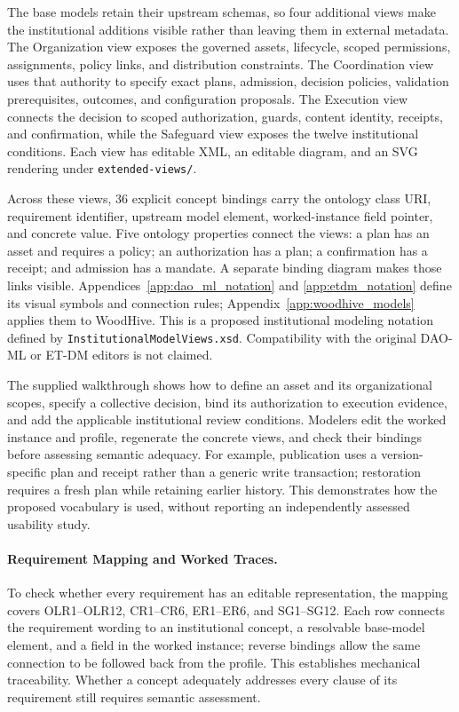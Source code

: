 \documentclass[journal]{IEEEtran}
\begin{document}
The base models retain their upstream schemas, so four additional views
make the institutional additions visible rather than leaving them in
external metadata. The Organization view exposes the governed assets,
lifecycle, scoped permissions, assignments, policy links, and distribution
constraints. The Coordination view uses that authority to specify exact
plans, admission, decision policies, validation prerequisites, outcomes,
and configuration proposals. The Execution view connects the decision
to scoped authorization, guards, content identity, receipts, and confirmation,
while the Safeguard view exposes the twelve institutional conditions.
Each view has editable XML, an editable diagram, and an SVG rendering
under \texttt{extended-views/}.

Across these views, 36 explicit concept bindings carry the
ontology class URI, requirement identifier, upstream model
element, worked-instance field pointer, and concrete value.
Five ontology properties connect the views: a plan has an
asset and requires a policy; an authorization has a plan;
a confirmation has a receipt; and admission has a mandate.
A separate binding diagram makes those links visible.
Appendices~\ref{app:dao_ml_notation} and
\ref{app:etdm_notation} define its visual symbols and connection
rules; Appendix~\ref{app:woodhive_models} applies them to WoodHive.
This is a proposed institutional modeling notation defined
by \texttt{InstitutionalModelViews.xsd}. Compatibility with
the original DAO-ML or ET-DM editors is not claimed.

The supplied walkthrough shows how to define an asset and
its organizational scopes, specify a collective decision,
bind its authorization to execution evidence, and add the
applicable institutional review conditions. Modelers edit
the worked instance and profile, regenerate the concrete
views, and check their bindings before assessing semantic
adequacy. For example, publication uses a version-specific
plan and receipt rather than a generic write transaction;
restoration requires a fresh plan while retaining earlier
history. This demonstrates how the proposed vocabulary is
used, without reporting an independently assessed usability
study.

\paragraph{Requirement Mapping and Worked Traces.}

To check whether every requirement has an editable representation,
the mapping covers OLR1--OLR12, CR1--CR6, ER1--ER6, and SG1--SG12.
Each row connects the requirement wording to an institutional concept,
a resolvable base-model element, and a field in the worked instance;
reverse bindings allow the same connection to be followed back from
the profile. This establishes mechanical traceability. Whether a
concept adequately addresses every clause of its requirement still
requires semantic assessment.
\end{document}
